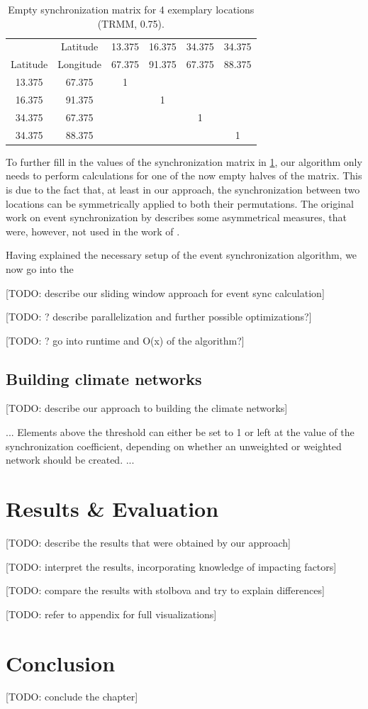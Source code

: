 \begin{table}[h]
  \centering
  \begin{tabular}{ |cc|cccc| }
    \hline
     & Latitude & 13.375 & 16.375 & 34.375 & 34.375 \\
    Latitude & Longitude & 67.375 & 91.375 & 67.375 & 88.375 \\
    \hline
    13.375 & 67.375 & 1 &   &   &   \\
    16.375 & 91.375 &   & 1 &   &   \\
    34.375 & 67.375 &   &   & 1 &   \\
    34.375 & 88.375 &   &   &   & 1 \\
    \hline
  \end{tabular}
  \caption{Empty synchronization matrix for 4 exemplary locations (TRMM, 0.75\degree).}
  \label{tab:example_empty_sync}
\end{table}

To further fill in the values of the synchronization matrix in \cref{tab:example_empty_sync}, our algorithm only needs to perform calculations for one of the now empty halves of the matrix. This is due to the fact that, at least in our approach, the synchronization between two locations can be symmetrically applied to both their permutations. The original work on event synchronization by \citet{QuianQuiroga.2002} describes some asymmetrical measures, that were, however, not used in the work of \citet{Stolbova.2015}.

Having explained the necessary setup of the event synchronization algorithm, we now go into the



[TODO: describe our sliding window approach for event sync calculation]

[TODO: ? describe parallelization and further possible optimizations?]

[TODO: ? go into runtime and O(x) of the algorithm?]

\subsection{Building climate networks}
\label{sst:building_climate_network}
[TODO: describe our approach to building the climate networks]

... Elements above the threshold can either be set to 1 or left at the value of the synchronization coefficient, depending on whether an unweighted or weighted network should be created. ...


\section{Results \& Evaluation}
\label{st:event_sync_results}
[TODO: describe the results that were obtained by our approach]

[TODO: interpret the results, incorporating knowledge of impacting factors]

[TODO: compare the results with stolbova and try to explain differences]

[TODO: refer to appendix for full visualizations]

\section{Conclusion}
\label{st:event_sync_conclusion}
[TODO: conclude the chapter]
